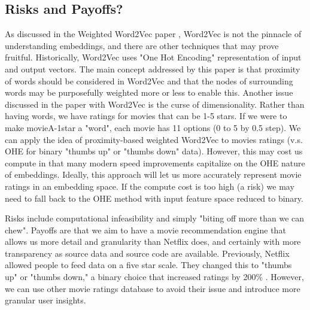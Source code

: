 \subsection{Risks and Payoffs?}

As discussed in the Weighted Word2Vec paper \cite{chang2017weighted}, Word2Vec is not the pinnacle of understanding embeddings, and there are other techniques that may prove fruitful. Historically, Word2Vec uses "One Hot Encoding" representation of input and output vectors. The main concept addressed by this paper is that proximity of words should be considered in Word2Vec and that the nodes of surrounding words may be purposefully weighted more or less to enable this. Another issue discussed in the paper with Word2Vec is the curse of dimensionality. Rather than having words, we have ratings for movies that can be 1-5 stars. If we were to make movieA-1star a "word", each movie has 11 options (0 to 5 by 0.5 step). We can apply the idea of proximity-based weighted Word2Vec to movies ratings (v.s. OHE for binary "thumbs up" or "thumbs down" data). However, this may cost us compute in that many modern speed improvements capitalize on the OHE nature of embeddings. Ideally, this approach will let us more accurately represent movie ratings in an embedding space. If the compute cost is too high (a risk) we may need to fall back to the OHE method with input feature space reduced to binary.

Risks include computational infeasibility and simply "biting off more than we can chew". Payoffs are that we aim to have a movie recommendation engine that allows us more detail and granularity than Netflix does, and certainly with more transparency as source data and source code are available. Previously, Netflix allowed people to feed data on a five star scale. They changed this to "thumbs up" or "thumbs down," a binary choice that increased ratings by 200\% \cite{Netflixh3:online}. However, we can use other movie ratings database to avoid their issue and introduce more granular user insights.
